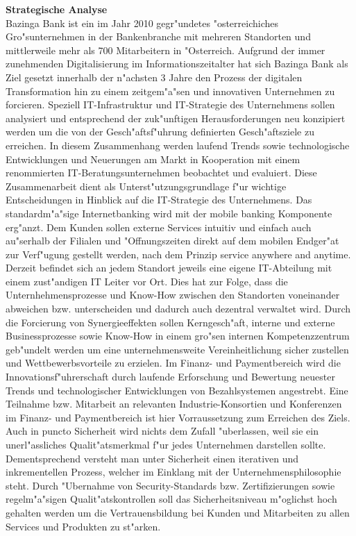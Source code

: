 \textbf{Strategische Analyse}\\

Bazinga Bank ist ein im Jahr 2010 gegr"undetes "osterreichiches Gro"sunternehmen in der Bankenbranche mit mehreren Standorten und mittlerweile mehr als 700 Mitarbeitern in "Osterreich. Aufgrund der immer zunehmenden Digitalisierung im Informationszeitalter hat sich Bazinga Bank als Ziel gesetzt innerhalb der n"achsten 3 Jahre den Prozess der digitalen Transformation hin zu einem zeitgem"a"sen und innovativen Unternehmen zu forcieren. Speziell IT-Infrastruktur und IT-Strategie des Unternehmens sollen analysiert und entsprechend der zuk"unftigen Herausforderungen neu konzipiert werden um die von der Gesch"aftsf"uhrung definierten Gesch"aftsziele zu erreichen. In diesem Zusammenhang werden laufend Trends sowie technologische Entwicklungen und Neuerungen am Markt in Kooperation mit einem renommierten IT-Beratungsunternehmen beobachtet und evaluiert. Diese Zusammenarbeit dient als Unterst"utzungsgrundlage f"ur wichtige Entscheidungen in Hinblick auf die IT-Strategie des Unternehmens. Das standardm"a"sige Internetbanking wird mit der mobile banking Komponente erg"anzt. Dem Kunden sollen externe Services intuitiv und einfach auch au"serhalb der Filialen und "Offnungszeiten direkt auf dem mobilen Endger"at zur Verf"ugung gestellt werden, nach dem Prinzip \glqq service anywhere and anytime\grqq. Derzeit befindet sich an jedem Standort jeweils eine eigene IT-Abteilung mit einem zust"andigen IT Leiter vor Ort. Dies hat zur Folge, dass die Unternhehmensprozesse und Know-How zwischen den Standorten voneinander abweichen bzw. unterscheiden und dadurch auch dezentral verwaltet wird. Durch die Forcierung von Synergieeffekten sollen Kerngesch"aft, interne und externe Businessprozesse sowie Know-How in einem gro"sen internen Kompetenzzentrum geb"undelt werden um eine unternehmensweite Vereinheitlichung sicher zustellen und Wettbewerbsvorteile zu erzielen. Im Finanz- und Paymentbereich wird die Innovationsf"uhrerschaft durch laufende Erforschung und Bewertung neuester Trends und technologischer Entwicklungen von Bezahlsystemen angestrebt. Eine Teilnahme bzw. Mitarbeit an relevanten Industrie-Konsortien und Konferenzen im Finanz- und Paymentbereich ist hier Vorraussetzung zum Erreichen des Ziels. Auch in puncto Sicherheit wird nichts dem Zufall "uberlassen, weil  sie ein unerl"assliches Qualit"atsmerkmal f"ur jedes Unternehmen darstellen sollte. Dementsprechend versteht man unter Sicherheit einen iterativen und inkrementellen Prozess, welcher im Einklang mit der Unternehmensphilosophie steht. Durch "Ubernahme von Security-Standards bzw. Zertifizierungen sowie regelm"a"sigen Qualit"atskontrollen soll das Sicherheitsniveau m"oglichst hoch gehalten werden um die Vertrauensbildung bei Kunden und Mitarbeiten zu allen Services und Produkten zu st"arken. \\

